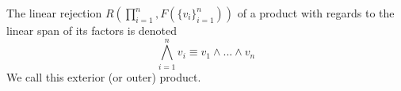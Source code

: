 \begin{definition}\label{d:exterior-product}
	The linear rejection $R(\prod_{i=1}^n, F(\{v_i\}_{i=1}^n))$ of a product with regards to the linear span of its factors is denoted
	\[ \bigwedge_{i=1}^n v_i \equiv v_1 \wedge ... \wedge v_n \]
	We call this exterior (or outer) product.
\end{definition}
